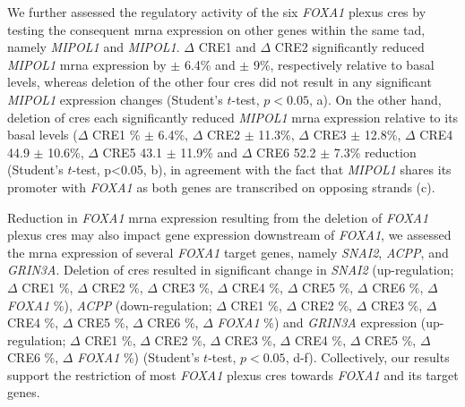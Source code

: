 We further assessed the regulatory activity of the six \emph{FOXA1} plexus \glspl{cre} by testing the consequent \gls{mrna} expression on other genes within the same \gls{tad}, namely \emph{MIPOL1} and \emph{MIPOL1}.
$\Delta$ CRE1 and $\Delta$ CRE2 significantly reduced \emph{MIPOL1} \gls{mrna} expression by  $\pm$ 6.4\% and  $\pm$ 9\%, respectively relative to basal levels, whereas deletion of the other four \glspl{cre} did not result in any significant \emph{MIPOL1} expression changes (Student's $t$-test, $p<0.05$, a).
On the other hand, deletion of \glspl{cre} each significantly reduced \emph{MIPOL1} \gls{mrna} expression relative to its basal levels ($\Delta$ CRE1 \% $\pm$ 6.4\%, $\Delta$ CRE2  $\pm$ 11.3\%, $\Delta$ CRE3  $\pm$ 12.8\%, $\Delta$ CRE4 44.9 $\pm$ 10.6\%, $\Delta$ CRE5 43.1 $\pm$ 11.9\% and $\Delta$ CRE6 52.2 $\pm$ 7.3\% reduction (Student's $t$-test, p<0.05, b), in agreement with the fact that \emph{MIPOL1} shares its promoter with \emph{FOXA1} as both genes are transcribed on opposing strands (c).

Reduction in \emph{FOXA1} \gls{mrna} expression resulting from the deletion of \emph{FOXA1} plexus \glspl{cre} may also impact gene expression downstream of \emph{FOXA1}, we assessed the \gls{mrna} expression of several \emph{FOXA1} target genes, namely \emph{SNAI2}, \emph{ACPP}, and \emph{GRIN3A}.
Deletion of \glspl{cre} resulted in significant change in \emph{SNAI2} (up-regulation; $\Delta$ CRE1 \%, $\Delta$ CRE2 \%, $\Delta$ CRE3 \%, $\Delta$ CRE4 \%, $\Delta$ CRE5 \%, $\Delta$ CRE6 \%, $\Delta$ \emph{FOXA1} \%), \emph{ACPP} (down-regulation; $\Delta$ CRE1 \%, $\Delta$ CRE2 \%, $\Delta$ CRE3 \%, $\Delta$ CRE4 \%, $\Delta$ CRE5 \%, $\Delta$ CRE6 \%, $\Delta$ \emph{FOXA1} \%) and \emph{GRIN3A} expression (up-regulation; $\Delta$ CRE1 \%, $\Delta$ CRE2 \%, $\Delta$ CRE3 \%, $\Delta$ CRE4 \%, $\Delta$ CRE5 \%, $\Delta$ CRE6 \%, $\Delta$ \emph{FOXA1} \%) (Student's $t$-test, $p < 0.05$, d-f).
Collectively, our results support the restriction of most \emph{FOXA1} plexus \glspl{cre} towards \emph{FOXA1} and its target genes.

